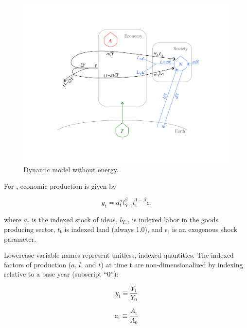 \documentclass[letterpaper,12pt]{article}
\begin{document}
\begin{figure} \label{fig:ModelWithoutEnergy}
  \begin{center}
    \includegraphics[width=\textwidth]{figure_other/ModelWithoutEnergy.pdf}
    \caption{Dynamic model without energy.}
  \end{center}
\end{figure}

For \citet{Jones:2001wn}, economic production is given by

\begin{equation} \label{eq:Jones_production_function}
	y_\mathrm{t} = a_\mathrm{t} ^\sigma l_\mathrm{Y,t} ^\beta t_\mathrm{t} ^{1-\beta} \epsilon_\mathrm{t}
\end{equation}

\noindent where $a_\mathrm{t}$ is the indexed stock of ideas, $l_\mathrm{Y,t}$ is indexed labor in the goods producing sector, $t_\mathrm{t}$ is indexed land (always 1.0), and $\epsilon_\mathrm{t}$ is an exogenous shock parameter. 

Lowercase variable names represent unitless, indexed quantities. The indexed factors of production ($a$, $l$, and $t$) at time $\mathrm{t}$ are non-dimensionalized by indexing relative to a base year (subscript ``0''):

\begin{equation} \label{eq:index_y}
	y_\mathrm{t} \equiv \frac{Y_\mathrm{t}}{Y_\mathrm{0}}
\end{equation}

\begin{equation} \label{eq:index_a}
	a_\mathrm{t} \equiv \frac{A_\mathrm{t}}{A_\mathrm{0}}
\end{equation}
\end{document}
